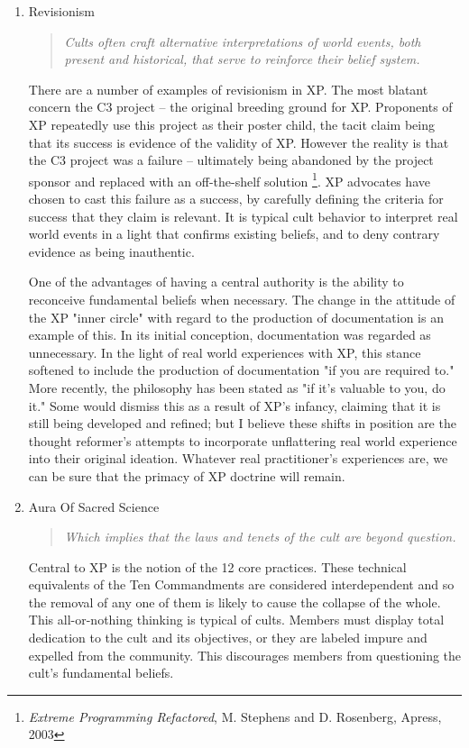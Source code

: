 \documentclass{article}
\begin{document}
\begin{enumerate}
\item Revisionism
\label{sec:orgheadline194}

\begin{quote}
\emph{Cults often craft alternative interpretations of world events, both
present and historical, that serve to reinforce their belief system.}
\end{quote}

There are a number of examples of revisionism in XP. The most blatant
concern the C3 project -- the original breeding ground for XP.
Proponents of XP repeatedly use this project as their poster child, the
tacit claim being that its success is evidence of the validity of XP.
However the reality is that the C3 project was a failure -- ultimately
being abandoned by the project sponsor and replaced with an
off-the-shelf solution \footnote{\emph{Extreme Programming Refactored}, M. Stephens and D. Rosenberg,
Apress, 2003}. XP advocates have chosen to cast this
failure as a success, by carefully defining the criteria for success
that they claim is relevant. It is typical cult behavior to interpret
real world events in a light that confirms existing beliefs, and to deny
contrary evidence as being inauthentic.

One of the advantages of having a central authority is the ability to
reconceive fundamental beliefs when necessary. The change in the
attitude of the XP "inner circle" with regard to the production of
documentation is an example of this. In its initial conception,
documentation was regarded as unnecessary. In the light of real world
experiences with XP, this stance softened to include the production of
documentation "if you are required to." More recently, the philosophy
has been stated as "if it's valuable to you, do it." Some would dismiss
this as a result of XP's infancy, claiming that it is still being
developed and refined; but I believe these shifts in position are the
thought reformer's attempts to incorporate unflattering real world
experience into their original ideation. Whatever real practitioner's
experiences are, we can be sure that the primacy of XP doctrine will
remain.

\item Aura Of Sacred Science
\label{sec:orgheadline195}

\begin{quote}
\emph{Which implies that the laws and tenets of the cult are beyond
question.}
\end{quote}

Central to XP is the notion of the 12 core practices. These technical
equivalents of the Ten Commandments are considered interdependent and so
the removal of any one of them is likely to cause the collapse of the
whole. This all-or-nothing thinking is typical of cults. Members must
display total dedication to the cult and its objectives, or they are
labeled impure and expelled from the community. This discourages members
from questioning the cult's fundamental beliefs.


\end{enumerate}
\end{document}
